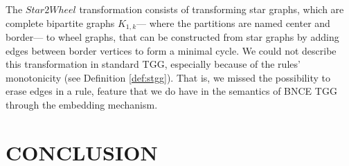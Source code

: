 \documentclass[a4paper,twoside]{article}
\begin{document}
The $Star2Wheel$ transformation consists of transforming star graphs, which are complete bipartite graphs $K_{1,k}$--- where the partitions are named center and border--- to wheel graphs, that can be constructed from star graphs by adding edges between border vertices to form a minimal cycle. We could not describe this transformation in standard TGG, especially because of the rules' monotonicity (see Definition \ref{def:stgg}). That is, we missed the possibility to erase edges in a rule, feature that we do have in the semantics of BNCE TGG through the embedding mechanism.

\section{\uppercase{Conclusion}}

\noindent


\vfill

{\small
}

\vfill
\end{document}

